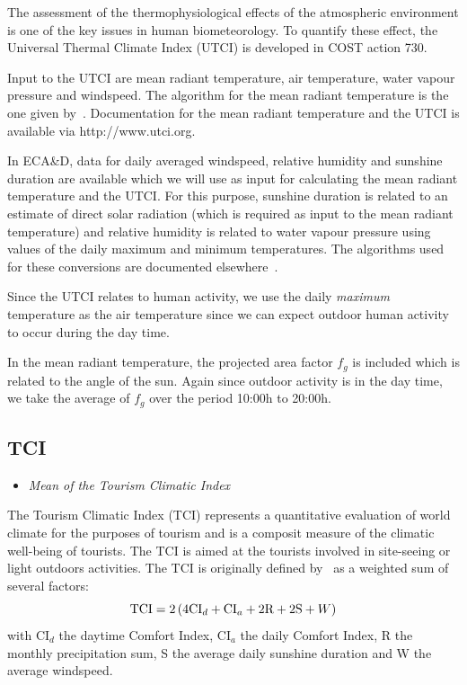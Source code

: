 \documentclass[a4paper,11pt]{article}
\begin{document}
The assessment of the thermophysiological effects of the atmospheric environment is one of the key issues in
human biometeorology. To quantify these effect, the Universal Thermal Climate Index (UTCI) is developed
in COST action 730. 

Input to the UTCI are mean radiant temperature, air temperature, water vapour 
pressure and windspeed.
The algorithm for the mean radiant temperature is the one given by~\citet{fanger:70}. Documentation for
the mean radiant temperature and the UTCI is available via http://www.utci.org.

In ECA\&D, data for daily averaged windspeed, relative humidity and sunshine duration are available which
we will use as input for calculating the mean radiant temperature and the UTCI. For this purpose, sunshine 
duration is related to an estimate of direct solar radiation (which is required as input to the mean radiant
temperature) and relative humidity is related to 
water vapour pressure using values of the daily maximum and minimum temperatures. The algorithms used for
these conversions are documented elsewhere~\citet{allen:94a,allen:94b,duffie:91}.

Since the UTCI relates to human activity, we use the daily
\emph{maximum} temperature as the air temperature since we can expect outdoor human activity to occur
during the day time.

In the mean radiant temperature, the projected area factor $f_g$ is included
which is related to the angle of the sun. Again since outdoor activity is in the day time, we take the
average of $f_g$ over the period 10:00h to 20:00h.

\subsection*{TCI}
\begin{itemize}
\item \textit{Mean of the Tourism Climatic Index}
\end{itemize}
The Tourism Climatic Index (TCI) represents a quantitative evaluation
of world climate for the purposes of tourism and is a composit
measure of the climatic well-being of tourists. 
The TCI is aimed at the tourists involved in site-seeing or light outdoors activities. 
The TCI is originally defined by~\citet{mieczkowski:85} as a weighted sum of several factors:
\begin{equation} \label{eq:tci1}
\text{TCI} = 2 \left( 4 \text{CI}_d + \text{CI}_a + 2 \text{R} + 2 \text{S} + W \right) \notag
\end{equation}
with CI$_d$ the daytime Comfort Index, CI$_a$ the daily Comfort Index, R the monthly precipitation sum,
S the average daily sunshine duration and W the average windspeed. 
\end{document}
